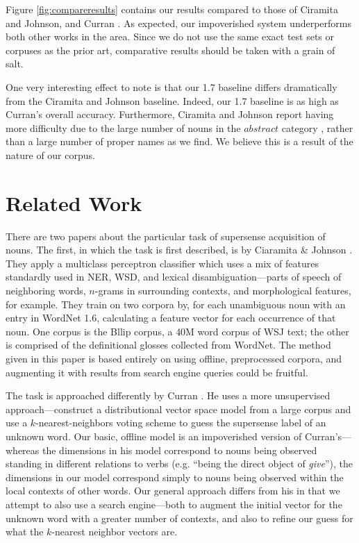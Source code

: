 \documentclass{article}
\begin{document}
Figure \ref{fig:compareresults} contains our results compared to those of Ciramita and Johnson, and Curran \cite{curran}.
As expected, our impoverished system underperforms both other works in the area.
Since we do not use the same exact test sets or corpuses as the prior art, comparative results should be taken with a grain of salt.

One very interesting effect to note is that our 1.7 baseline differs dramatically from the Ciramita and Johnson baseline. 
Indeed, our 1.7 baseline is as high as Curran's overall accuracy.
Furthermore, Ciramita and Johnson report having more difficulty due to the large number of nouns in the $abstract$ category \cite{cj}, rather than a large number of proper names as we find.
We believe this is a result of the nature of our corpus.


\section{Related Work}


There are two papers about the particular task of supersense acquisition of nouns.
The first, in which the task is first described, is by Ciaramita \& Johnson \cite{cj}.
They apply a multiclass perceptron classifier which uses a mix of features standardly used in NER, WSD, and lexical disambiguation---parts of speech of neighboring words, $n$-grams in surrounding contexts, and morphological features, for example.
They train on two corpora by, for each unambiguous noun with an entry in WordNet 1.6, calculating a feature vector for each occurrence of that noun.
One corpus is the Bllip corpus, a 40M word corpus of WSJ text; the other is comprised of the definitional glosses collected from WordNet.
The method given in this paper is based entirely on using offline, preprocessed corpora, and augmenting it with results from search engine queries could be fruitful.

The task is approached differently by Curran \cite{curran}.
He uses a more unsupervised approach---construct a distributional vector space model from a large corpus and use a $k$-nearest-neighbors voting scheme to guess the supersense label of an unknown word.
Our basic, offline model is an impoverished version of Curran's---whereas the dimensions in his model correspond to nouns being observed standing in different relations to verbs (e.g. ``being the direct object of {\it give}''), the dimensions in our model correspond simply to nouns being observed within the local contexts of other words.
Our general approach differs from his in that we attempt to also use a search engine---both to augment the initial vector for the unknown word with a greater number of contexts, and also to refine our guess for what the $k$-nearest neighbor vectors are.
\end{document}
